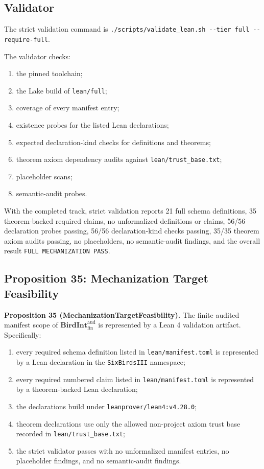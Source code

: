 \documentclass[11pt]{article}
\providecommand{\tightlist}{}
\theoremstyle{definition}
\begin{document}
\subsection{Validator}

The strict validation command is \texttt{./scripts/validate\_lean.sh\ -\/-tier\ full\ -\/-require-full}.

The validator checks:

\begin{enumerate}
\def\labelenumi{\arabic{enumi}.}
\tightlist
\item
  the pinned toolchain;
\item
  the Lake build of \texttt{lean/full};
\item
  coverage of every manifest entry;
\item
  existence probes for the listed Lean declarations;
\item
  expected declaration-kind checks for definitions and theorems;
\item
  theorem axiom dependency audits against \texttt{lean/trust\_base.txt};
\item
  placeholder scans;
\item
  semantic-audit probes.
\end{enumerate}

With the completed track, strict validation reports 21 full schema definitions, 35 theorem-backed required claims, no unformalized definitions or claims, 56/56 declaration probes passing, 56/56 declaration-kind checks passing, 35/35 theorem axiom audits passing, no placeholders, no semantic-audit findings, and the overall result \texttt{FULL\ MECHANIZATION\ PASS}.

\subsection{Proposition 35: Mechanization Target Feasibility}

\textbf{Proposition 35 (MechanizationTargetFeasibility).} The finite audited manifest scope of \(\mathbf{BirdInt}^{\mathrm{aud}}_{\mathrm{fin}}\) is represented by a Lean 4 validation artifact. Specifically:

\begin{enumerate}
\def\labelenumi{\arabic{enumi}.}
\tightlist
\item
  every required schema definition listed in \texttt{lean/manifest.toml} is represented by a Lean declaration in the \texttt{SixBirdsIII} namespace;
\item
  every required numbered claim listed in \texttt{lean/manifest.toml} is represented by a theorem-backed Lean declaration;
\item
  the declarations build under \texttt{leanprover/lean4:v4.28.0};
\item
  theorem declarations use only the allowed non-project axiom trust base recorded in \texttt{lean/trust\_base.txt};
\item
  the strict validator passes with no unformalized manifest entries, no placeholder findings, and no semantic-audit findings.
\end{enumerate}
\end{document}
